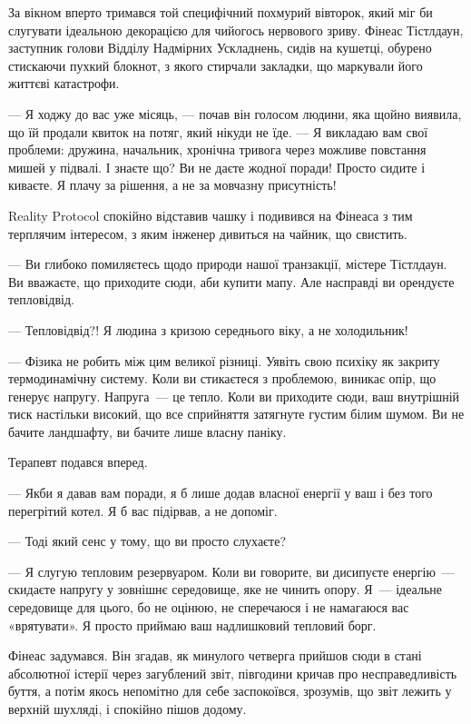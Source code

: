 \documentclass[12pt, a4paper, openany]{book}
\begin{document}
\begin{realitybox}
За вікном вперто тримався той специфічний похмурий вівторок, який міг би слугувати ідеальною декорацією для чийогось нервового зриву. Фінеас Тістлдаун, заступник голови Відділу Надмірних Ускладнень, сидів на кушетці, обурено стискаючи пухкий блокнот, з якого стирчали закладки, що маркували його життєві катастрофи.

--- Я ходжу до вас уже місяць, --- почав він голосом людини, яка щойно виявила, що їй продали квиток на потяг, який нікуди не їде. --- Я викладаю вам свої проблеми: дружина, начальник, хронічна тривога через можливе повстання мишей у підвалі. І знаєте що? Ви не даєте жодної поради! Просто сидите і киваєте. Я плачу за рішення, а не за мовчазну присутність!

\medskip
Reality Protocol спокійно відставив чашку і подивився на Фінеаса з тим терплячим інтересом, з яким інженер дивиться на чайник, що свистить.

--- Ви глибоко помиляєтесь щодо природи нашої транзакції, містере Тістлдаун. Ви вважаєте, що приходите сюди, аби купити мапу. Але насправді ви орендуєте тепловідвід.

--- Тепловідвід?! Я людина з кризою середнього віку, а не холодильник!

--- Фізика не робить між цим великої різниці. Уявіть свою психіку як закриту термодинамічну систему. Коли ви стикаєтеся з проблемою, виникає опір, що генерує напругу. Напруга~--- це тепло. Коли ви приходите сюди, ваш внутрішній тиск настільки високий, що все сприйняття затягнуте густим білим шумом. Ви не бачите ландшафту, ви бачите лише власну паніку.

Терапевт подався вперед.

--- Якби я давав вам поради, я б лише додав власної енергії у ваш і без того перегрітий котел. Я б вас підірвав, а не допоміг.

--- Тоді який сенс у тому, що ви просто слухаєте?

--- Я слугую тепловим резервуаром. Коли ви говорите, ви дисипуєте енергію~--- скидаєте напругу у зовнішнє середовище, яке не чинить опору. Я~--- ідеальне середовище для цього, бо не оцінюю, не сперечаюся і не намагаюся вас «врятувати». Я просто приймаю ваш надлишковий тепловий борг.

\medskip
Фінеас задумався. Він згадав, як минулого четверга прийшов сюди в стані абсолютної істерії через загублений звіт, півгодини кричав про несправедливість буття, а потім якось непомітно для себе заспокоївся, зрозумів, що звіт лежить у верхній шухляді, і спокійно пішов додому.


\end{realitybox}
\end{document}
